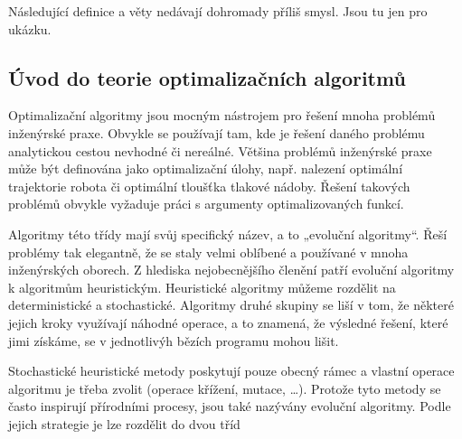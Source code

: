 \documentclass[bc,male,java,dept460]{diploma}		%
\begin{document}
\begin{remark}
Následující definice a věty nedávají dohromady příliš smysl. Jsou tu jen pro ukázku.
\end{remark}

\subsection{Úvod do teorie optimalizačních algoritmů}
\par
Optimalizační algoritmy jsou mocným nástrojem pro řešení mnoha problémů inženýrské praxe. Obvykle se používají tam, kde je řešení daného problému analytickou cestou nevhodné či nereálné.
Většina problémů inženýrské praxe může být definována jako optimalizační úlohy, např. nalezení optimální trajektorie robota či optimální tloušťka tlakové nádoby. Řešení takových problémů obvykle vyžaduje práci s argumenty optimalizovaných funkcí.
\par
Algoritmy této třídy mají svůj specifický název, a to „evoluční algoritmy“. Řeší problémy tak elegantně, že se staly velmi oblíbené a používané v mnoha inženýrských oborech. Z hlediska nejobecnějšího členění patří evoluční algoritmy k algoritmům heuristickým. Heuristické algoritmy můžeme rozdělit na deterministické a stochastické. Algoritmy druhé skupiny se liší v tom, že některé jejich kroky využívají náhodné operace, a to znamená, že výsledné řešení, které jimi získáme, se v jednotlivýh bězích programu  mohou lišit.
\par
Stochastické heuristické metody poskytují pouze obecný rámec a vlastní operace algoritmu je třeba zvolit (operace křížení, mutace, …). Protože tyto metody se často inspirují přírodními procesy, jsou také nazývány evoluční algoritmy. Podle jejich strategie je lze rozdělit do dvou tříd
\end{document}
